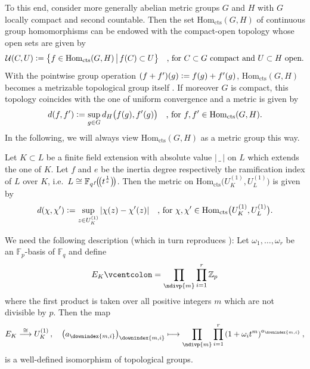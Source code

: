 \documentclass[a4paper, reqno, 10pt]{amsart}
\theoremstyle{definition}
\numberwithin{equation}{section}
\newcommand{\abs}[1]{{\lvert{#1}\rvert}}
\newcommand{\blank}{{\,\_\,}}
\newcommand{\cont}{{\mathrm{cts}}}
\newcommand{\defeq}{\vcentcolon=}
\newcommand{\Hom}{{\mathrm{Hom}}}
\newcommand{\lra}{\longrightarrow}
\newcommand{\lto}{\longmapsto}
\newcommand{\BF}{{\mathbb {F}}}
\newcommand{\BZ}{{\mathbb {Z}}}
\newcommand{\CU}{{\mathcal {U}}}
\begin{document}
To this end, consider more generally abelian metric groups $G$ and $H$ with $G$ locally compact and second countable.
Then the set $\Hom_\cont (G,H)$ of continuous group homomorphisms can be endowed with the compact-open topology whose open sets are given by
\begin{equation*}
	\CU(C,U) \defeq \big\{ f \in \Hom_\cont (G,H) \,\big\vert\, f(C) \subset U \big\} \quad\text{, for $C\subset G$ compact and $U\subset H$ open.}
\end{equation*}
With the pointwise group operation $(f+f')(g)\defeq f(g)+f'(g)$, $\Hom_\cont (G,H)$ becomes a metrizable topological group itself \cite[Prop.\ 6.5.2]{Markley10TopGrpsIntro}.
If moreover $G$ is compact, this topology coincides with the one of uniform convergence and a metric is given by \cite[p.\ 238]{Markley10TopGrpsIntro}
\begin{equation*}
	d(f,f') \defeq \sup_{g \in G} d_H \big(f(g),f'(g) \big) \quad\text{, for $f,f'\in \Hom_\cont (G,H)$.}
\end{equation*}
In the following, we will always view $\Hom_\cont (G,H)$ as a metric group this way.

Let $K\subset L$ be a finite field extension with absolute value $\abs{\blank}$ on $L$ which extends the one of $K$.
Let $f$ and $e$ be the inertia degree respectively the ramification index of $L$ over $K$, i.e.\ $L \cong \BF_{q^f} \mkern-3mu \big(\mkern-3mu \big( t^\frac{1}{e} \big) \mkern-3mu \big) $.
Then the metric on $\Hom_\cont \big(U_K^{(1)},U_L^{(1)} \big)$ is given by
\begin{equation*}
	d(\chi,\chi') \defeq \sup_{z \in U_K^{(1)}} \abs{\chi(z) - \chi'(z)} \quad\text{, for $\chi,\chi'\in \Hom_\cont \big(U_K^{(1)}, U_L^{(1)} \big)$.}
\end{equation*}


We need the following description \cite[II.\ Satz 5.7 (ii)]{Neukirch92AlgZahlenTh} (which in turn reproduces \cite[Prop.\ 2.8]{Iwasawa86LocClassFieldTh}):
Let $\omega_1,\ldots,\omega_r$ be an $\BF_p$-basis of $\BF_q$ and define
\begin{equation*}
	E_K \defeq \prod_\ndivp{m} \prod_{i=1}^r \BZ_p
\end{equation*}
where the first product is taken over all positive integers $m$ which are not divisible by $p$.
Then the map
\begin{equation}\label{Eq A2 - Isomorphism for one-units}
	E_K \overset{\cong}{\lra} U_K^{(1)} \,, \quad \big(a_\downindex{{m,i}} \big)_\downindex{{m,i}} \lto \prod_\ndivp{m} \prod_{i=1}^r \left( 1 + \omega_i t^m \right)^{a_\downindex{{m,i}}} ,
\end{equation}
is a well-defined isomorphism of topological groups.
\end{document}
